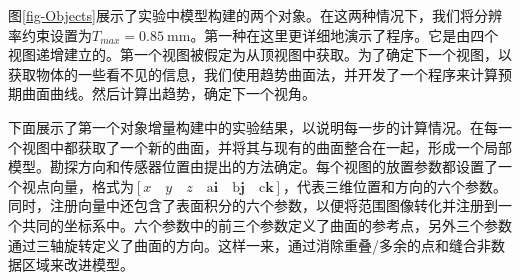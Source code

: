 \documentclass[AutoFakeBold,zihao=-4]{ctexart}
\begin{document}
	图\ref{fig-Objects}展示了实验中模型构建的两个对象。在这两种情况下，我们将分辨率约束设置为$ T_{max}=0.85 \mathrm{~mm} $。第一种在这里更详细地演示了程序。它是由四个视图递增建立的。第一个视图被假定为从顶视图中获取。为了确定下一个视图，以获取物体的一些看不见的信息，我们使用趋势曲面法，并开发了一个程序来计算预期曲面曲线。然后计算出趋势，确定下一个视角。
	
	下面展示了第一个对象增量构建中的实验结果，以说明每一步的计算情况。在每一个视图中都获取了一个新的曲面，并将其与现有的曲面整合在一起，形成一个局部模型。勘探方向和传感器位置由提出的方法确定。每个视图的放置参数都设置了一个视点向量，格式为$ [x \quad y \quad z \quad \mathrm{a} \boldsymbol{i} \quad \mathrm{b} \boldsymbol{j} \quad \mathrm{c} \boldsymbol{k}] $，代表三维位置和方向的六个参数。同时，注册向量中还包含了表面积分的六个参数，以便将范围图像转化并注册到一个共同的坐标系中。六个参数中的前三个参数定义了曲面的参考点，另外三个参数通过三轴旋转定义了曲面的方向。这样一来，通过消除重叠/多余的点和缝合非数据区域来改进模型。
	
\end{document}
